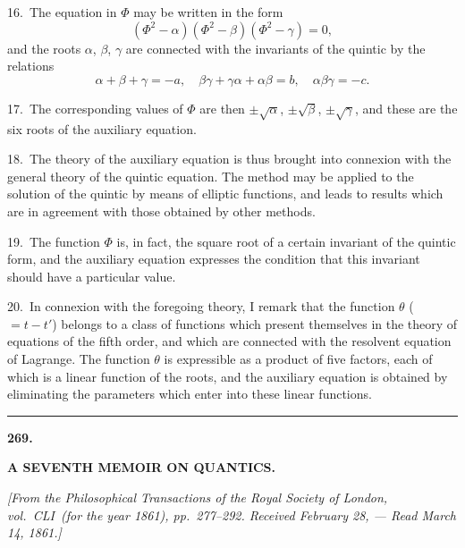 \documentclass[11pt,a4paper]{article}
\theoremstyle{plain}
\theoremstyle{definition}
\theoremstyle{remark}
\begin{document}
\newpage
\setcounter{page}{328}

16.\ The equation in $\Phi$ may be written in the form
\[
(\Phi^2-\alpha)(\Phi^2-\beta)(\Phi^2-\gamma) = 0,
\]
and the roots $\alpha$, $\beta$, $\gamma$ are connected with the invariants of the quintic by the relations
\[
\alpha+\beta+\gamma = -a,\quad \beta\gamma+\gamma\alpha+\alpha\beta = b,\quad \alpha\beta\gamma = -c.
\]

17.\ The corresponding values of $\Phi$ are then $\pm\surd\alpha$, $\pm\surd\beta$, $\pm\surd\gamma$, and these are the six roots of the auxiliary equation.

\newpage
\setcounter{page}{329}

18.\ The theory of the auxiliary equation is thus brought into connexion with the general theory of the quintic equation. The method may be applied to the solution of the quintic by means of elliptic functions, and leads to results which are in agreement with those obtained by other methods.

19.\ The function $\Phi$ is, in fact, the square root of a certain invariant of the quintic form, and the auxiliary equation expresses the condition that this invariant should have a particular value.

20.\ In connexion with the foregoing theory, I remark that the function $\theta$ ($=t-t'$) belongs to a class of functions which present themselves in the theory of equations of the fifth order, and which are connected with the resolvent equation of Lagrange. The function $\theta$ is expressible as a product of five factors, each of which is a linear function of the roots, and the auxiliary equation is obtained by eliminating the parameters which enter into these linear functions.

\bigskip
\begin{center}
\rule{0.5\textwidth}{0.4pt}
\end{center}


\newpage
\setcounter{page}{330}
\begin{center}
\textbf{269.}\par
\smallskip
\textbf{A SEVENTH MEMOIR ON QUANTICS.}\par
\smallskip
\textit{[From the \textit{Philosophical Transactions} of the Royal Society of London, vol.~CLI\ (for the year 1861), pp.~277--292. Received February 28, --- Read March 14, 1861.]}
\end{center}
\end{document}
